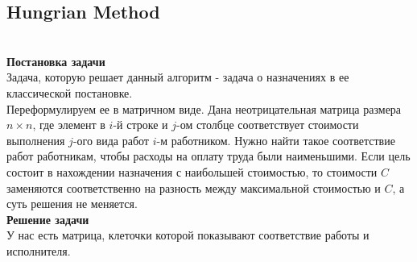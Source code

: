 \subsection{Hungrian Method} \\
{\bfseries Постановка задачи}\\
Задача, которую решает данный алгоритм - задача о назначениях в ее классической постановке.\\
Переформулируем ее в матричном виде. Дана неотрицательная матрица размера $n × n$, где элемент в $i$-й строке и $j$-ом столбце соответствует стоимости выполнения $j$-ого вида работ $i$-м работником. Нужно 
найти такое соответствие работ работникам, чтобы расходы на оплату труда были наименьшими. Если цель состоит в нахождении назначения с наибольшей стоимостью, то стоимости $C$ заменяются соответственно на разность 
между максимальной стоимостью и $C$, а суть решения не меняется.\\
{\bfseries Решение задачи}\\
У нас есть матрица, клеточки которой показывают соответствие работы и исполнителя.
